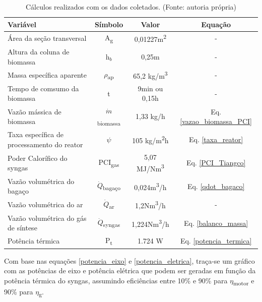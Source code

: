 \begin{table}[h]
	\centering
	\caption{Cálculos realizados com os dados coletados. (Fonte: autoria própria)}
	\begin{tabular}{|l|c|c|c|}
		\hline
		Variável & Símbolo & Valor & Equação \\
		\hline
		
		Área da seção transversal & A\textsubscript{g} & 0,01227m\textsuperscript{2} & - \\
		
		Altura da coluna de biomassa & h$_b$ & 0,25m & -\\
		
		Massa específica aparente & $\rho$\textsubscript{ap} & 65,2 kg/m\textsuperscript{3} & - \\
		
		Tempo de comsumo da biomassa & t & 9min ou 0,15h & -\\
		
		Vazão mássica de biomassa & $\dot{m}$\textsubscript{biomassa} & 1,33 kg/h & Eq. \ref{vazao_biomassa_PCI}\\
		
		Taxa específica de processamento do reator & $\psi$ & 105 kg/m\textsuperscript{2}h & Eq. \ref{taxa_reator}\\
		
		\rowcolor{lightgray} Poder Calorífico do syngas & PCI\textsubscript{gas} & 5,07 MJ/Nm\textsuperscript{3} & Eq. \ref{PCI_Tiangco}\\
		
		Vazão volumétrica do bagaço & $\dot{Q}$\textsubscript{bagaço} & 0,024m\textsuperscript{3}/h & Eq. \ref{qdot_bagaco}\\
		
		Vazão volumétrica do ar & $\dot{Q}$\textsubscript{ar} & 1,2Nm\textsuperscript{3}/h & -\\
		
		Vazão volumétrica do gás de síntese & $\dot{Q}$\textsubscript{syngas} & 1,224Nm\textsuperscript{3}/h & Eq. \ref{balanco_massa}\\
		
		\rowcolor{lightgray} Potência térmica & P\textsubscript{t} & 1.724 W & Eq. \ref{potencia_termica}\\
		
		\hline
\end{tabular}
\label{tabela_resultados_2}
\end{table}	

Com base nas equações \ref{potencia_eixo} e \ref{potencia_eletrica}, traça-se um gráfico com as potências de eixo e potência elétrica que podem ser geradas em função da potência térmica do syngas, assumindo eficiências entre 10\% e 90\% para $\eta$\textsubscript{motor} e 90\% para $\eta$\textsubscript{g}.

